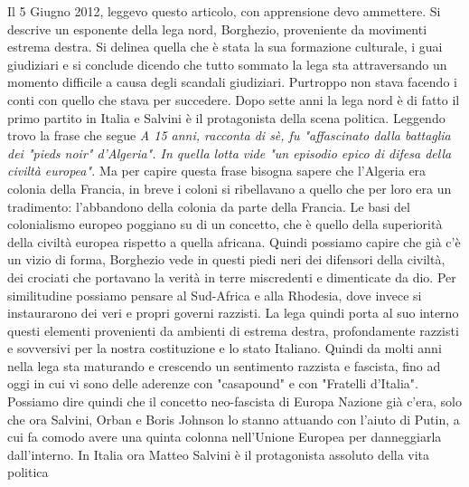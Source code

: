 \documentclass[a4,10pt,oneside,openany]{memoir}
\begin{document}
Il 5 Giugno 2012, leggevo questo articolo, con apprensione devo ammettere. Si descrive un esponente della lega nord, Borghezio, proveniente da movimenti estrema destra. Si delinea quella che è stata la sua formazione culturale, i guai giudiziari e si conclude dicendo che tutto sommato la lega sta attraversando un momento difficile a causa degli scandali giudiziari. 
Purtroppo non stava facendo i conti con quello che stava per succedere. Dopo sette anni la lega nord è di fatto il primo partito in Italia e Salvini è il protagonista della scena politica.
Leggendo trovo la frase che segue \emph{A 15 anni, racconta di sè, fu "affascinato dalla battaglia dei "pieds noir" d'Algeria". In quella lotta vide "un episodio epico di difesa della civiltà europea".}
Ma per capire questa frase bisogna sapere che l'Algeria era colonia della Francia, in breve i coloni si ribellavano a quello che per loro era un tradimento: l'abbandono della colonia da parte della Francia. Le basi del colonialismo europeo poggiano su di un concetto, che è quello della superiorità della civiltà europea rispetto a quella africana. Quindi possiamo capire che già c'è un vizio di forma, Borghezio vede in questi piedi neri dei difensori della civiltà, dei crociati che portavano la verità in terre miscredenti e dimenticate da dio. Per similitudine possiamo pensare al Sud-Africa e alla Rhodesia, dove invece si instaurarono dei veri e propri governi razzisti.\newline
La lega quindi porta al suo interno questi elementi provenienti da ambienti di estrema destra, profondamente razzisti e sovversivi per la nostra costituzione e lo stato Italiano. Quindi da molti anni nella lega sta maturando e crescendo un sentimento razzista e fascista, fino ad oggi in cui vi sono delle aderenze con "casapound" e con "Fratelli d'Italia". Possiamo dire quindi che il concetto neo-fascista di Europa Nazione già c'era, solo che ora Salvini, Orban e Boris Johnson lo stanno attuando con l'aiuto di Putin, a cui fa comodo avere una quinta colonna nell'Unione Europea per danneggiarla dall'interno.
In Italia ora Matteo Salvini è il protagonista assoluto della vita politica
\end{document}
